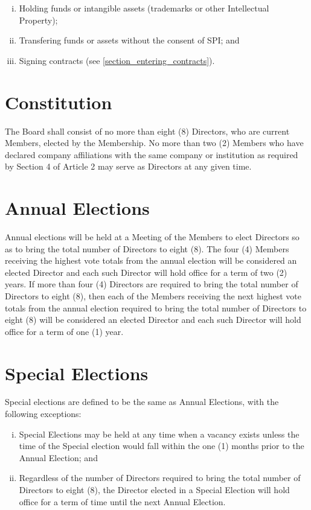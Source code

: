 \documentclass[10pt, english]{xorgdocs}
\begin{document}
\begin{enumerate}[(i)\hspace{.2cm}]
	\item Holding funds or intangible assets (trademarks or other
Intellectual Property);

	\item Transfering funds or assets without the consent of SPI; and

	\item Signing contracts (see \ref{section_entering_contracts}).
\end{enumerate}

\section{Constitution}
The Board shall consist of no more than eight (8) Directors, who are current
Members, elected by the Membership.  No more than two (2) Members who have
declared company affiliations with the same company or institution as required
by Section 4 of Article 2 may serve as Directors at any given time.

\section{Annual Elections}
Annual elections will be held at a Meeting of the Members to elect Directors so
as to bring the total number of Directors to eight (8).  The four (4) Members
receiving the highest vote totals from the annual election will be considered an
elected Director and each such Director will hold office for a term of two (2)
years.  If more than four (4) Directors are required to bring
the total number of Directors to eight (8), then each of the Members receiving
the next highest vote totals from the annual election required to bring the
total number of Directors to eight (8) will be considered an elected Director
and each such Director will hold office for a term of one (1) year.

\section{Special Elections}
Special elections are defined to be the same as Annual Elections, with the
following exceptions:

\begin{enumerate}[(i)\hspace{.2cm}]
	\item Special Elections may be held at any time when a vacancy exists
	unless the time of the Special election would fall within the one (1)
	months prior to the Annual Election; and

	\item Regardless of the number of Directors required to bring the total
	number of Directors to eight (8), the Director elected in a Special
	Election will hold office for a term of time until the next Annual
	Election.
\end{enumerate}
\end{document}
